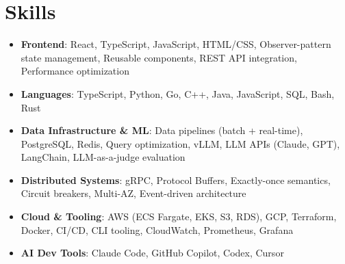 \documentclass[letterpaper,11pt]{article}
\newcommand{\resumeSubHeadingListStart}{\begin{itemize}[leftmargin=0.15in, label={}]}
\newcommand{\resumeSubHeadingListEnd}{\end{itemize}}
\newcommand{\resumeSkillHeading}[2]{%
  \item\small{\textbf{#1}: #2 \vspace{-9pt}}%
}
\begin{document}
\section{Skills}
  \resumeSubHeadingListStart
    \resumeSkillHeading{Frontend}{React, TypeScript, JavaScript, HTML/CSS, Observer-pattern state management, Reusable components, REST API integration, Performance optimization}
    \resumeSkillHeading{Languages}{TypeScript, Python, Go, C++, Java, JavaScript, SQL, Bash, Rust}
    \resumeSkillHeading{Data Infrastructure \& ML}{Data pipelines (batch + real-time), PostgreSQL, Redis, Query optimization, vLLM, LLM APIs (Claude, GPT), LangChain, LLM-as-a-judge evaluation}
    \resumeSkillHeading{Distributed Systems}{gRPC, Protocol Buffers, Exactly-once semantics, Circuit breakers, Multi-AZ, Event-driven architecture}
    \resumeSkillHeading{Cloud \& Tooling}{AWS (ECS Fargate, EKS, S3, RDS), GCP, Terraform, Docker, CI/CD, CLI tooling, CloudWatch, Prometheus, Grafana}
    \resumeSkillHeading{AI Dev Tools}{Claude Code, GitHub Copilot, Codex, Cursor}
  \resumeSubHeadingListEnd
\end{document}
